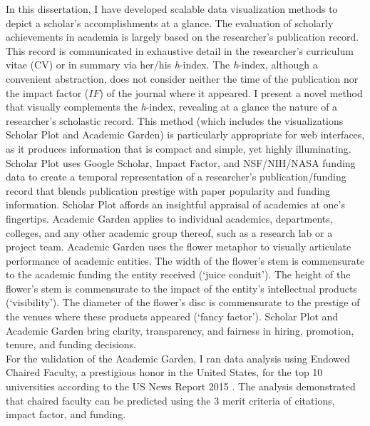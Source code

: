 In this dissertation, I have developed scalable data visualization methods to depict a scholar's accomplishments at a glance. The evaluation of scholarly achievements in academia is largely based on the researcher's publication record. This record is communicated in exhaustive detail in the researcher's curriculum vitae (CV) or in summary via her/his {\it h}-index. The {\it h}-index, although a convenient abstraction, does not consider neither the time of the publication nor the impact factor ($IF$) of the journal where it appeared. I present a novel method that visually complements the {\it h}-index, revealing at a glance the nature of a researcher's scholastic record. This method (which includes the visualizations Scholar Plot and Academic Garden) is particularly appropriate for web interfaces, as it produces information that is compact and simple, yet highly illuminating.\\

Scholar Plot uses Google Scholar, Impact Factor, and NSF/NIH/NASA funding data to create a temporal representation of a researcher's publication/funding record that blends publication prestige with paper popularity and funding information. Scholar Plot affords an insightful appraisal of academics at one's fingertips. Academic Garden applies to individual academics, departments, colleges, and any other academic group thereof, such as a research lab or a project team. Academic Garden uses the flower metaphor to visually articulate performance of academic entities. The width of the flower's stem is commensurate to the academic funding the entity received (`juice conduit'). The height of the flower's stem is commensurate to the impact of the entity's intellectual products (`visibility'). The diameter of the flower's disc is commensurate to the prestige of the venues where these products appeared (`fancy factor'). Scholar Plot and Academic Garden bring clarity, transparency, and fairness in hiring, promotion, tenure, and funding decisions.\\

For the validation of the Academic Garden, I ran data analysis using Endowed Chaired Faculty, a prestigious honor in the United States, for the top 10 universities according to the US News Report 2015 \cite{usnews}. The analysis demonstrated that chaired faculty can be predicted using the 3 merit criteria of citations, impact factor, and funding.